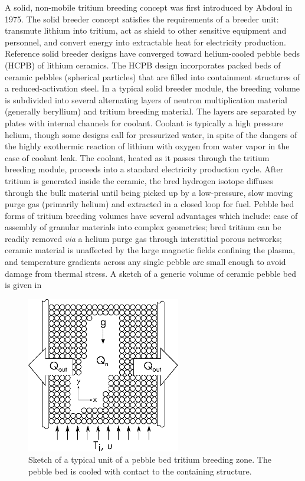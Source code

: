 \documentclass[11pt]{report} %
\begin{document}
A solid, non-mobile tritium breeding concept was first introduced by Abdoul\cite{Abdou1975} in 1975. The solid breeder concept satisfies the requirements of a breeder unit: transmute lithium into tritium, act as shield to other sensitive equipment and personnel, and convert energy into extractable heat for electricity production. Reference solid breeder designs have converged toward helium-cooled pebble beds (HCPB) of lithium ceramics.  The HCPB design incorporates packed beds of ceramic pebbles (spherical particles) that are filled into containment structures of a reduced-activation steel. In a typical solid breeder module, the breeding volume is subdivided into several alternating layers of neutron multiplication material (generally beryllium) and tritium breeding material. The layers are separated by plates with internal channels for coolant. Coolant is typically a high pressure helium, though some designs call for pressurized water, in spite of the dangers of the highly exothermic reaction of lithium with oxygen from water vapor in the case of coolant leak. The coolant, heated as it passes through the tritium breeding module, proceeds into a standard electricity production cycle. After tritium is generated inside the ceramic, the bred hydrogen isotope diffuses through the bulk material until being picked up by a low-pressure, slow moving purge gas (primarily helium) and extracted in a closed loop for fuel. Pebble bed forms of tritium breeding volumes have several advantages which include: ease of assembly of granular materials into complex geometries; bred tritium can be readily removed \textit{via} a helium purge gas through interstitial porous networks; ceramic material is unaffected by the large magnetic fields confining the plasma, and temperature gradients across any single pebble are small enough to avoid damage from thermal stress. A sketch of a generic volume of ceramic pebble bed is given in 

\begin{figure}[ht]
	\centering
	\includegraphics[width=0.6\textwidth]{images/x-domain} 
	\caption{Sketch of a typical unit of a pebble bed tritium breeding zone. The pebble bed is cooled with contact to the containing structure.}
	\label{fig:solid-breeder-sketch}
\end{figure}
\end{document}
